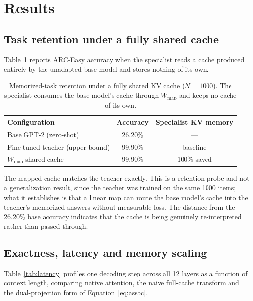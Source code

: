 \documentclass[11pt]{article}
\begin{document}
\section{Results}

\subsection{Task retention under a fully shared cache}

Table~\ref{tab:arc} reports ARC-Easy accuracy when the specialist reads a cache produced
entirely by the unadapted base model and stores nothing of its own.

\begin{table}[ht]
\centering
\small
\caption{Memorized-task retention under a fully shared KV cache ($N = 1000$). The specialist
consumes the base model's cache through $W_{\mathrm{map}}$ and keeps no cache of its own.}
\label{tab:arc}
\begin{tabular}{lcc}
\toprule
Configuration & Accuracy & Specialist KV memory \\
\midrule
Base GPT-2 (zero-shot) & 26.20\% & --- \\
Fine-tuned teacher (upper bound) & 99.90\% & baseline \\
$W_{\mathrm{map}}$ shared cache & 99.90\% & 100\% saved \\
\bottomrule
\end{tabular}
\end{table}

The mapped cache matches the teacher exactly. This is a retention probe and not a
generalization result, since the teacher was trained on the same 1000 items; what it
establishes is that a linear map can route the base model's cache into the teacher's
memorized answers without measurable loss. The distance from the 26.20\% base accuracy
indicates that the cache is being genuinely re-interpreted rather than passed through.

\subsection{Exactness, latency and memory scaling}
\label{sec:latency}

Table~\ref{tab:latency} profiles one decoding step across all 12 layers as a function of
context length, comparing native attention, the naive full-cache transform and the
dual-projection form of Equation~\eqref{eq:assoc}.
\end{document}
